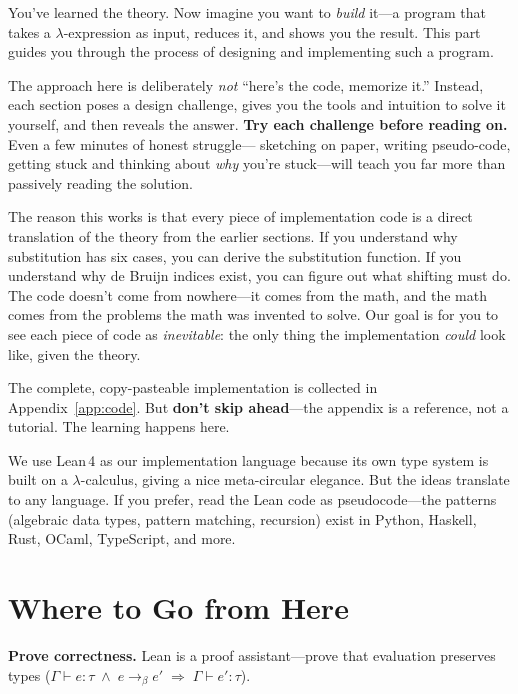\documentclass[11pt,a4paper]{article}
\theoremstyle{definition}
\newcommand{\lam}{\lambda}
\newcommand{\reduce}{\longrightarrow_\beta}
\newcommand{\proves}{\vdash}
\begin{document}
You've learned the theory. Now imagine you want to \emph{build} it---a program
that takes a $\lam$-expression as input, reduces it, and shows you the result.
This part guides you through the process of designing and implementing such a
program.

The approach here is deliberately \emph{not} ``here's the code, memorize it.''
Instead, each section poses a design challenge, gives you the tools and
intuition to solve it yourself, and then reveals the answer. \textbf{Try each
challenge before reading on.} Even a few minutes of honest struggle---
sketching on paper, writing pseudo-code, getting stuck and thinking about
\emph{why} you're stuck---will teach you far more than passively reading the
solution.

The reason this works is that every piece of implementation code is a direct
translation of the theory from the earlier sections. If you understand why
substitution has six cases, you can derive the substitution function. If you
understand why de Bruijn indices exist, you can figure out what shifting must
do. The code doesn't come from nowhere---it comes from the math, and the math
comes from the problems the math was invented to solve. Our goal is for you to
see each piece of code as \emph{inevitable}: the only thing the implementation
\emph{could} look like, given the theory.

The complete, copy-pasteable implementation is collected in
Appendix~\ref{app:code}. But \textbf{don't skip ahead}---the appendix is a
reference, not a tutorial. The learning happens here.

We use Lean\,4 as our implementation language because its own type system is
built on a $\lam$-calculus, giving a nice meta-circular elegance. But the ideas
translate to any language. If you prefer, read the Lean code as pseudocode---the
patterns (algebraic data types, pattern matching, recursion) exist in Python,
Haskell, Rust, OCaml, TypeScript, and more.

\section{Where to Go from Here}

\textbf{Prove correctness.} Lean is a proof assistant---prove that evaluation
preserves types ($\Gamma \proves e : \tau \;\wedge\; e \reduce e'
\;\Longrightarrow\; \Gamma \proves e' : \tau$).
\end{document}
